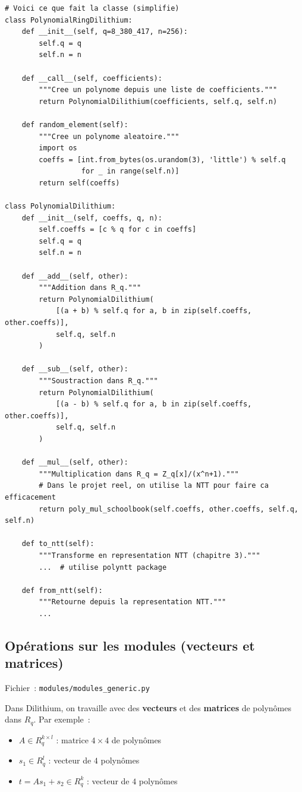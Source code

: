 \documentclass[12pt, a4paper]{article}
\newcommand{\Rq}{R_q}
\begin{document}
\begin{lstlisting}[style=python]
# Voici ce que fait la classe (simplifie)
class PolynomialRingDilithium:
    def __init__(self, q=8_380_417, n=256):
        self.q = q
        self.n = n

    def __call__(self, coefficients):
        """Cree un polynome depuis une liste de coefficients."""
        return PolynomialDilithium(coefficients, self.q, self.n)

    def random_element(self):
        """Cree un polynome aleatoire."""
        import os
        coeffs = [int.from_bytes(os.urandom(3), 'little') % self.q
                  for _ in range(self.n)]
        return self(coeffs)

class PolynomialDilithium:
    def __init__(self, coeffs, q, n):
        self.coeffs = [c % q for c in coeffs]
        self.q = q
        self.n = n

    def __add__(self, other):
        """Addition dans R_q."""
        return PolynomialDilithium(
            [(a + b) % self.q for a, b in zip(self.coeffs, other.coeffs)],
            self.q, self.n
        )

    def __sub__(self, other):
        """Soustraction dans R_q."""
        return PolynomialDilithium(
            [(a - b) % self.q for a, b in zip(self.coeffs, other.coeffs)],
            self.q, self.n
        )

    def __mul__(self, other):
        """Multiplication dans R_q = Z_q[x]/(x^n+1)."""
        # Dans le projet reel, on utilise la NTT pour faire ca efficacement
        return poly_mul_schoolbook(self.coeffs, other.coeffs, self.q, self.n)

    def to_ntt(self):
        """Transforme en representation NTT (chapitre 3)."""
        ...  # utilise polyntt package

    def from_ntt(self):
        """Retourne depuis la representation NTT."""
        ...
\end{lstlisting}

\subsection{Opérations sur les modules (vecteurs et matrices)}

Fichier~: \texttt{modules/modules\_generic.py}

Dans Dilithium, on travaille avec des \textbf{vecteurs} et des \textbf{matrices}
de polynômes dans $\Rq$. Par exemple~:
\begin{itemize}
  \item $A \in \Rq^{k \times l}$ : matrice $4 \times 4$ de polynômes
  \item $s_1 \in \Rq^l$ : vecteur de $4$ polynômes
  \item $t = As_1 + s_2 \in \Rq^k$ : vecteur de $4$ polynômes
\end{itemize}
\end{document}
